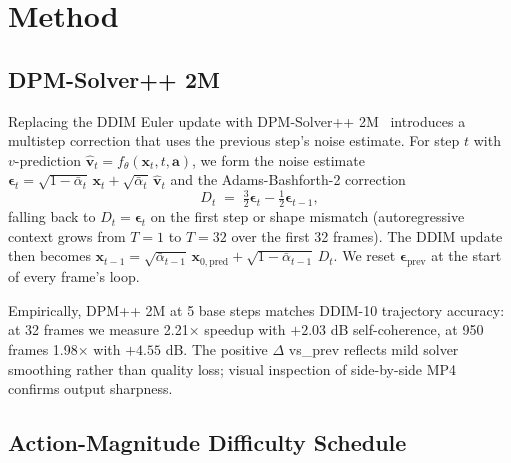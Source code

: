 \documentclass[10pt,letterpaper,twocolumn]{article}
\begin{document}
\section{Method}

\subsection{DPM-Solver++ 2M}
\label{sec:dpmpp}

Replacing the DDIM Euler update with DPM-Solver++ 2M~\citep{lu2022dpmsolverpp} introduces a multistep correction that uses the previous step's noise estimate. For step $t$ with $v$-prediction $\hat{\mathbf{v}}_t = f_\theta(\mathbf{x}_t, t, \mathbf{a})$, we form the noise estimate $\boldsymbol{\epsilon}_t = \sqrt{1-\bar\alpha_t}\,\mathbf{x}_t + \sqrt{\bar\alpha_t}\,\hat{\mathbf{v}}_t$ and the Adams-Bashforth-2 correction
\[
D_t \;=\; \tfrac{3}{2}\boldsymbol{\epsilon}_t - \tfrac{1}{2}\boldsymbol{\epsilon}_{t-1},
\]
falling back to $D_t = \boldsymbol{\epsilon}_t$ on the first step or shape mismatch (autoregressive context grows from $T=1$ to $T=32$ over the first 32 frames). The DDIM update then becomes $\mathbf{x}_{t-1} = \sqrt{\bar\alpha_{t-1}}\,\mathbf{x}_{0,\text{pred}} + \sqrt{1-\bar\alpha_{t-1}}\,D_t$. We reset $\boldsymbol{\epsilon}_{\text{prev}}$ at the start of every frame's loop.

Empirically, DPM++ 2M at 5 base steps matches DDIM-10 trajectory accuracy: at 32 frames we measure 2.21$\times$ speedup with $+2.03$ dB self-coherence, at 950 frames 1.98$\times$ with $+4.55$ dB. The positive $\Delta$ vs\_prev reflects mild solver smoothing rather than quality loss; visual inspection of side-by-side MP4 confirms output sharpness.

\subsection{Action-Magnitude Difficulty Schedule}
\end{document}
